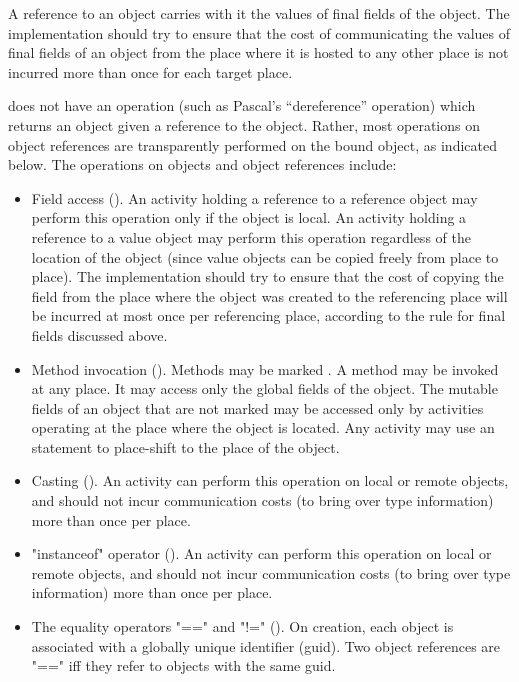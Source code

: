 A reference to an object carries with it the values of final  fields
of the object. The implementation should try to ensure that the cost
of communicating the values of final fields of an object from the
place where it is hosted to any other place is not incurred more than
once for each target place.

{}\Xten{} does not have an operation (such as Pascal's ``dereference''
operation) which returns an object given a reference to the
object. Rather, most operations on object references are transparently
performed on the bound object, as indicated below. The operations on
objects and object references include:
\begin{itemize}

{}\item Field access (). An activity holding a
reference to a reference object may perform this operation only if the
object is local.  An activity holding a reference to a value object
may perform this operation regardless of the location of the object
(since value objects can be copied freely from place to place).  The
implementation should try to ensure that the cost of copying the field
from the place where the object was created to the referencing place
will be incurred at most once per referencing place, according to the
rule for final fields discussed above.

\item Method invocation ().  
Methods may be marked . A  method may 
be invoked at any place. It may access only the global fields
of the object. The mutable fields of an object that are not marked
 may be accessed only by activities operating at the place
where the object is located. Any activity may use an  statement
to place-shift to the place of the object.

{}\item Casting ().  An activity can perform this
operation on local or remote objects, and should not incur
communication costs (to bring over type information) more than once
per place.

{}\item \xcd"instanceof" operator ().  An activity
can perform this operation on local or remote objects, and should not
incur communication costs (to bring over type information) more than
once per place.

\item The equality operators \xcd"==" and \xcd"!="
(). On creation, each object is associated with a globally
unique identifier (guid). Two object references are \xcd"==" iff they refer to objects
with the  same guid.

\end{itemize}

